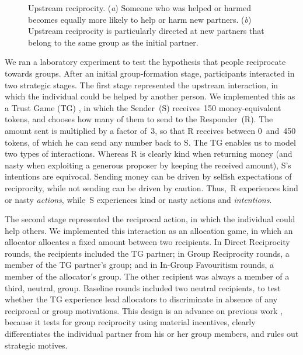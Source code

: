 \documentclass[12pt,a4paper]{article}
\begin{document}
\begin{figure}
\begin{center}
\begin{subfigure}[b]{0.4\textwidth}
            \caption{}\label{group}
        \end{subfigure}
        \caption{Upstream reciprocity. (\textit{a}) Someone who was helped or harmed becomes equally more likely to help or harm new partners. (\textit{b}) Upstream reciprocity is particularly directed at new partners that belong to the same group as the initial partner.}
        \label{fig:illustration}
	\end{center}
\end{figure}

We ran a laboratory experiment to test the hypothesis that people
reciprocate towards groups. After an initial group-formation stage,
participants interacted in two strategic stages. The first stage represented
the upstream interaction, in which the individual could be helped
by another person. We implemented this as a Trust Game (TG) \citep{berg1995trust},
in which the Sender~(S) receives~150 money-equivalent tokens, and
chooses how many of them to send to the Responder~(R). The amount
sent is multiplied by a factor of~3, so that R receives between 0~and~450
tokens, of which he can send any number back to S. The TG enables
us to model two types of interactions. Whereas R is clearly kind when
returning money (and nasty when exploiting a generous proposer by
keeping the received amount), S's intentions are equivocal. Sending
money can be driven by selfish expectations of reciprocity, while
not sending can be driven by caution. Thus,~R experiences kind or
nasty \emph{actions}, while~S experiences kind or nasty actions and
\emph{intentions}.

The second stage represented the reciprocal action, in which the individual
could help others. We implemented this interaction as an allocation
game, in which an allocator allocates a fixed amount between two recipients.
In Direct Reciprocity rounds, the recipients included the TG partner;
in Group Reciprocity rounds, a member of the TG partner's group; and
in In-Group Favouritism rounds, a member of the allocator's group.
The other recipient was always a member of a third, neutral, group.
Baseline rounds included two neutral recipients, to test whether the
TG experience lead allocators to discriminate in absence of any reciprocal
or group motivations. This design is an advance on previous work
\citep{gaertner2008whenrejection,stenstrom2008theroles,hugh-jones2013intergroup},
because it tests for group reciprocity using material incentives,
clearly differentiates the individual partner from his or her group
members, and rules out strategic motives.
\end{document}
